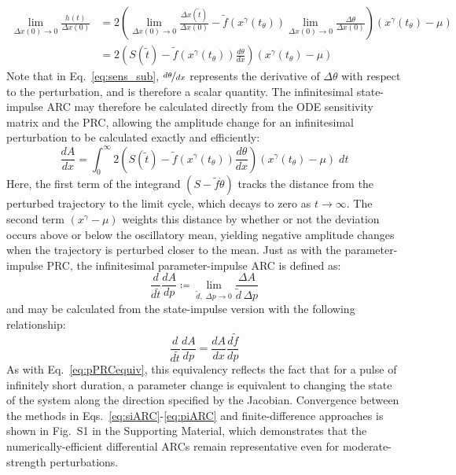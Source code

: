 \documentclass[11pt, letterpaper]{article}
\begin{document}
\begin{align}
  \lim_{\Delta x(0) \to 0} \frac{h(t)}{\Delta x(0)} &= 2\left(\lim_{\Delta x(0) \to 0}\frac{\Delta x(\tilde{t})}{\Delta x(0)} - \tilde{f}\left(x^\gamma(t_\theta)\right)\lim_{\Delta x(0) \to 0}\frac{\Delta\theta}{\Delta x(0)}\right) \left(x^\gamma(t_\theta) - \mu\right)\\
  &= 2\left(S(\tilde{t}) - \tilde{f}(x^\gamma(t_\theta))\frac{d\theta}{dx}\right)\left(x^\gamma(t_\theta) - \mu\right)
  \label{eq:sens_sub}
\end{align}
Note that in Eq.~\ref{eq:sens_sub}, $\nicefrac{d\theta}{dx}$ represents the derivative of $\Delta\theta$ with respect to the perturbation, and is therefore a scalar quantity.
The infinitesimal state-impulse ARC may therefore be calculated directly from the ODE sensitivity matrix and the PRC, allowing the amplitude change for an infinitesimal perturbation to be calculated exactly and efficiently:
\begin{equation}
  \frac{dA}{dx} = \int_0^\infty 2\left(S(\tilde{t}) - \tilde{f}(x^\gamma(t_\theta))\frac{d\theta}{dx}\right)\left(x^\gamma(t_\theta) - \mu\right) \; dt
  \label{eq:siARC}
\end{equation}
Here, the first term of the integrand $(S - \tilde{f}\dot{\theta})$ tracks the distance from the perturbed trajectory to the limit cycle, which decays to zero as $t \to \infty$.
The second term $(x^\gamma - \mu)$ weights this distance by whether or not the deviation occurs above or below the oscillatory mean, yielding negative amplitude changes when the trajectory is perturbed closer to the mean.
Just as with the parameter-impulse PRC, the infinitesimal parameter-impulse ARC is defined as:
\begin{equation}
  \frac{d}{d\tilde{t}}\frac{dA}{dp} \coloneqq \lim_{\tilde{d},\; \Delta p \to 0}
  \frac{\Delta A}{\tilde{d}\, \Delta p}
\end{equation}
and may be calculated from the state-impulse version with the following relationship:
\begin{equation}
  \frac{d}{d\tilde{t}}\frac{dA}{dp} = \frac{dA}{dx}\frac{d\tilde{f}}{dp}
    \label{eq:piARC}
\end{equation}
As with Eq.~\ref{eq:pPRCequiv}, this equivalency reflects the fact that for a pulse of infinitely short duration, a parameter change is equivalent to changing the state of the system along the direction specified by the Jacobian.
Convergence between the methods in Eqs.~\ref{eq:siARC}-\ref{eq:piARC} and finite-difference approaches is shown in Fig.~S1 in the Supporting Material, which demonstrates that the numerically-efficient differential ARCs remain representative even for moderate-strength perturbations.
\end{document}
